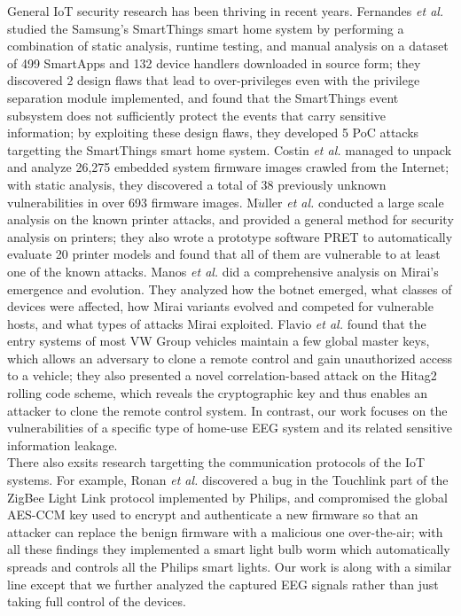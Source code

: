 General IoT security research has been thriving in recent years. Fernandes \emph{et al.} \cite{fernandes2016security} studied the Samsung's SmartThings smart home system by performing a combination of static analysis, runtime testing, and manual analysis on a dataset of 499 SmartApps and 132 device handlers downloaded in source form; they discovered 2 design flaws that lead to over-privileges even with the privilege separation module implemented, and found that the SmartThings event subsystem does not sufficiently protect the events that carry sensitive information; by exploiting these design flaws, they developed 5 PoC attacks targetting the SmartThings smart home system.  Costin \emph{et al.} \cite{costin2014large} managed to unpack and analyze 26,275 embedded system firmware images crawled from the Internet; with static analysis, they discovered a total of 38 previously unknown vulnerabilities in over 693 firmware images. M$\ddot{u}$ller \emph{et al.} \cite{muller2017sok} conducted a large scale analysis on the known printer attacks, and provided a general method for security analysis on printers; they also wrote a prototype software PRET to automatically evaluate 20 printer models and found that all of them are vulnerable to at least one of the known attacks. Manos \emph{et al.} \cite{antonakakis2017understanding} did a comprehensive analysis on Mirai's emergence and evolution. They analyzed how the botnet emerged, what classes of devices were affected, how Mirai variants evolved and competed for vulnerable hosts, and what types of attacks Mirai exploited.  Flavio \emph{et al.}  \cite{garcia2016lock} found that the entry systems of most VW Group vehicles maintain a few global master keys, which allows an adversary to clone a remote control and gain unauthorized access to a vehicle; they also presented a novel correlation-based attack on the Hitag2 rolling code scheme, which reveals the cryptographic key and thus enables an attacker to clone the remote control system. In contrast, our work focuses on the vulnerabilities of a specific type of home-use EEG system and its related sensitive information leakage. \\
%
\indent There also exsits research targetting the communication protocols of the IoT systems. For example, Ronan \emph{et al.} \cite{ronen2017iot} discovered a bug in the Touchlink part of the ZigBee Light Link protocol implemented by Philips, and compromised the global AES-CCM key used to encrypt and authenticate a new firmware so that an attacker can replace the benign firmware with a malicious one over-the-air; with all these findings they implemented a smart light bulb worm which automatically spreads and controls all the Philips smart lights. Our work is along with a similar line except that we further analyzed the captured EEG signals rather than just taking full control of the devices.


